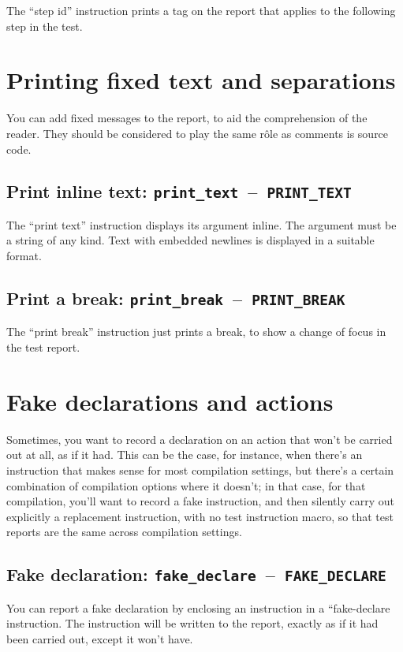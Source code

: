 \documentclass[twoside, a4paper, article]{memoir}
\newcommand*\testudocolor{\color{red!80!blue}}
\newcommand*\testudo[1]{\texttt{\testudocolor{}#1}}
\newcommand*\testudopair[2]{\testudo{#1}~--~\testudo{#2}}
\newcommand\subsectiontestudopair[3]{%
  \subsection[#1]{#1: \testudopair{#2}{#3}}}
\providecommand\typesetexample[1]{%
}
\begin{document}
The ``step id'' instruction prints a tag on the report that applies to the
following step in the test.

\typesetexample{step-id}


\section{Printing fixed text and separations}
\label{sec:printing-text-separations}

You can add fixed messages to the report, to aid the comprehension of the
reader.  They should be considered to play the same rôle as comments is source
code.

\subsectiontestudopair{Print inline text}{print\_text}{PRINT\_TEXT}
\label{sec:print-inline-text}

The ``print text'' instruction displays its argument inline.  The argument must
be a string of any kind.  Text with embedded newlines is displayed in a
suitable format.

\typesetexample{print-text}


\subsectiontestudopair{Print a break}{print\_break}{PRINT\_BREAK}
\label{sec:print-break}

The ``print break'' instruction just prints a break, to show a change of focus
in the test report.

\typesetexample{print-break}


\section{Fake declarations and actions}
\label{sec:fake-declarations-actions}

Sometimes, you want to record a declaration on an action that won't be carried
out at all, as if it had.  This can be the case, for instance, when there's an
instruction that makes sense for most compilation settings, but there's a
certain combination of compilation options where it doesn't; in that case, for
that compilation, you'll want to record a fake instruction, and then silently
carry out explicitly a replacement instruction, with no test instruction macro,
so that test reports are the same across compilation settings.

\subsectiontestudopair{Fake declaration}{fake\_declare}{FAKE\_DECLARE}
\label{sec:fake-declaration}

You can report a fake declaration by enclosing an instruction in a
``fake-declare instruction.  The instruction will be written to the report,
exactly as if it had been carried out, except it won't have.
\end{document}
